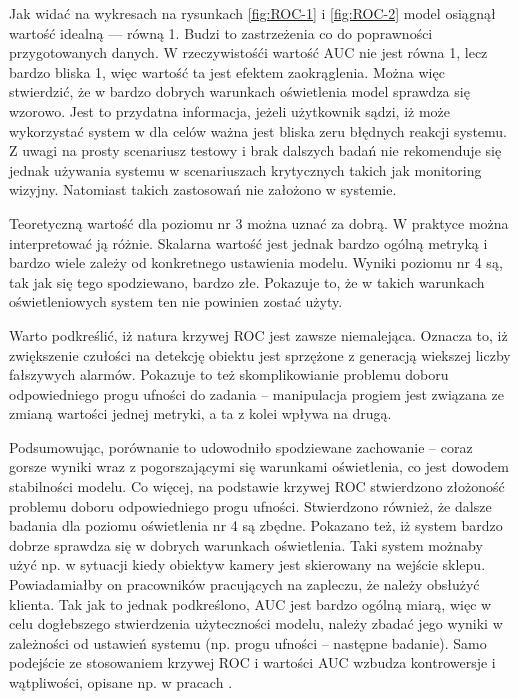 Jak widać na wykresach na rysunkach \ref{fig:ROC-1} i \ref{fig:ROC-2} model osiągnął wartość idealną --- równą 1. Budzi to zastrzeżenia co do poprawności przygotowanych danych. W rzeczywistośći wartość AUC nie jest równa 1, lecz bardzo bliska 1, więc wartość ta jest efektem zaokrąglenia. Można więc stwierdzić, że w bardzo dobrych warunkach oświetlenia model sprawdza się wzorowo. Jest to przydatna informacja, jeżeli użytkownik sądzi, iż może wykorzystać system w dla celów ważna jest bliska zeru błędnych reakcji systemu. Z uwagi na prosty scenariusz testowy i brak dalszych badań nie rekomenduje się jednak używania systemu w scenariuszach krytycznych takich jak monitoring wizyjny. Natomiast takich zastosowań nie założono w systemie. 

Teoretyczną wartość dla poziomu nr 3 można uznać za dobrą. W praktyce można interpretować ją różnie. Skalarna wartość jest jednak bardzo ogólną metryką i bardzo wiele zależy od konkretnego ustawienia modelu. Wyniki poziomu nr 4 są, tak jak się tego spodziewano, bardzo złe. Pokazuje to, że w takich warunkach oświetleniowych system ten nie powinien zostać użyty. 

Warto podkreślić, iż natura krzywej ROC jest zawsze niemalejąca. Oznacza to, iż zwiększenie czułości na detekcję obiektu jest sprzężone z generacją wiekszej liczby fałszywych alarmów.
Pokazuje to też skomplikowianie problemu doboru odpowiedniego progu ufności do zadania -- manipulacja progiem jest związana ze zmianą wartości jednej metryki, a ta z kolei wpływa na drugą.

Podsumowując, porównanie to udowodniło spodziewane zachowanie -- coraz gorsze wyniki wraz z pogorszającymi się warunkami oświetlenia, co jest dowodem stabilności modelu. Co więcej, na podstawie krzywej ROC stwierdzono złożoność problemu doboru odpowiedniego progu ufności. Stwierdzono również, że dalsze badania dla poziomu oświetlenia nr 4 są zbędne. Pokazano też, iż system bardzo dobrze sprawdza się w dobrych warunkach oświetlenia. Taki system możnaby użyć  np. w sytuacji kiedy obiektyw kamery jest skierowany na wejście sklepu. Powiadamiałby on pracowników pracujących na zapleczu, że należy obsłużyć klienta. 
Tak jak to jednak podkreślono, AUC jest bardzo ogólną miarą, więc w celu dogłebszego stwierdzenia użyteczności modelu, należy zbadać jego wyniki w zależności od ustawień systemu (np. progu ufności -- następne badanie). Samo podejście ze stosowaniem krzywej ROC i wartości AUC wzbudza kontrowersje i wątpliwości, opisane np. w pracach \cite{AUC_critique1,AUC_critique2}.






